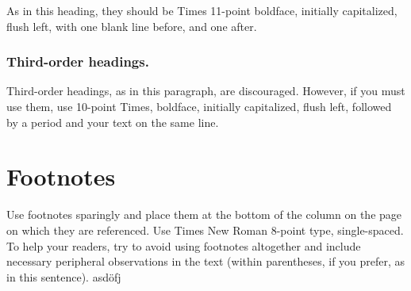 \documentclass[10pt]{article}
\newcommand{\sansserifformat}[1]{\fontfamily{cmss}{ #1}}%
\begin{document}
As in this heading, they should be Times 11-point boldface, initially capitalized, flush left, with one blank line before, and one after.

\subsubsection{Third-order headings. }

Third-order headings, as in this paragraph, are discouraged. However, if you must use them, use 10-point Times, boldface, initially capitalized, flush left, followed by a period and your text on the same line.

\section{Footnotes}

Use footnotes sparingly and place them at the bottom of the column on the page on which they are referenced. Use Times New Roman 8-point type, single-spaced. To help your readers, try to avoid using footnotes altogether and include necessary peripheral observations in the text (within parentheses, if you prefer, as in this sentence).
asdöfj



\end{document}

